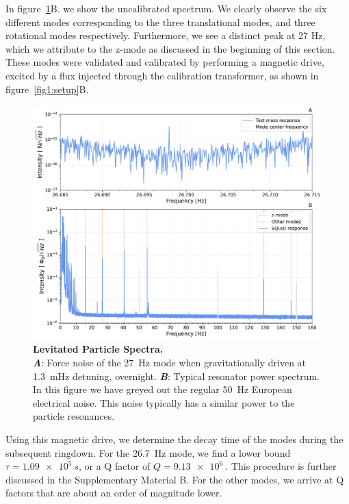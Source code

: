 \documentclass[pdflatex,sn-mathphys]{sn-jnl}
\begin{document}
%


    In figure~\ref{fig2:spectrum}B. we show the uncalibrated spectrum.
    We clearly observe the six different modes corresponding to the three translational modes, and three rotational modes respectively. 
    Furthermore, we see a distinct peak at 27 Hz, which we attribute to the z-mode as discussed in the beginning of this section.
    These modes were validated and calibrated by performing a magnetic drive, excited by a flux injected through the calibration transformer, as shown in figure~\ref{fig1:setup}B. 
    
    \begin{figure}[ht]%
        \centering
        \includegraphics[width=\textwidth]{Results/paper_spectrum_combined.pdf}%
        \caption{\textbf{Levitated Particle Spectra.}\\
        \textbf{\emph{A}}: Force noise of the \SI{27}{Hz} mode when gravitationally driven at \SI{1.3}{mHz} detuning, overnight. \textbf{\emph{B}}: Typical resonator power spectrum. In this figure we have greyed out the regular \SI{50}{Hz} European electrical noise. This noise typically has a similar power to the particle resonances.}\label{fig2:spectrum}
    \end{figure}
    
    Using this magnetic drive, we determine the decay time of the modes during the subsequent ringdown. For the \SI{26.7}{Hz} mode, we find a lower bound  $\tau = \SI{1.09e5}{s}$, or a Q factor of $Q = \SI{9.13e6}{}$. This procedure is further discussed in the Supplementary Material B. For the other modes, we arrive at Q factors that are about an order of magnitude lower.
    
\end{document}
